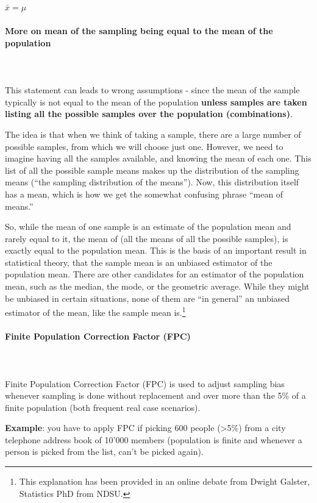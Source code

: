 \documentclass{article}
\begin{document}
$\bar{x} = \mu $

\paragraph{More on mean of the sampling being equal to the mean of the population}\mbox{} \\
\mbox{} \\
This statement can leads to wrong assumptions - since the mean of the sample typically is not equal to the mean of the population \textbf{unless samples are taken listing all the possible samples over the population (combinations)}.

The idea is that when we think of taking a sample, there are a large number of possible samples, from which we will choose just one. However, we need to imagine having all the samples available, and knowing the mean of each one. This list of all the possible sample means makes up the distribution of the sampling means (“the sampling distribution of the means”). Now, this distribution itself has a mean, which is how we get the somewhat confusing phrase “mean of means.”

So, while the mean of one sample is an estimate of the population mean and rarely equal to it, the mean of (all the means of all the possible samples), is exactly equal to the population mean. This is the basis of an important result in statistical theory, that the sample mean is an unbiased estimator of the population mean. There are other candidates for an estimator of the population mean, such as the median, the mode, or the geometric average. While they might be unbiased in certain situations, none of them are “in general” an unbiased estimator of the mean, like the sample mean is.\footnote{This explanation has been provided in an online debate from Dwight Galster, Statistics PhD from NDSU.}

\paragraph{Finite Population Correction Factor (FPC)}\mbox{} \\
\mbox{} \\
Finite Population Correction Factor (FPC) is used to adjust sampling bias whenever sampling is done without replacement and over more than the 5\% of a finite population (both frequent real case scenarios).

\textbf{Example}: you have to apply FPC if picking 600 people (>5\%) from a city telephone address book of 10’000 members (population is finite and whenever a person is picked from the list, can’t be picked again).
\end{document}

